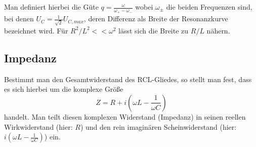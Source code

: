 Man definiert hierbei die Güte $q=\frac{\omega}{\omega_+ - \omega_-}$ wobei $\omega_\pm$ die beiden Frequenzen sind,
bei denen $U_C = \frac{1}{\sqrt{2}} U_{C,max}$, deren Differenz als Breite der Resonanzkurve bezeichnet wird.
Für $R^2/L^2 << \omega^2$ lässt sich die Breite zu $R/L$ nähern.

\subsection{Impedanz}
Bestimmt man den Gesamtwiderstand des RCL-Gliedes, so stellt man fest, dass es sich hierbei um die komplexe Größe
\begin{equation}
  Z = R + i\left(\omega L - \frac{1}{\omega C}\right)
\end{equation}
handelt. Man teilt diesen komplexen Widerstand (Impedanz) in seinen reellen Wirkwiderstand (hier: $R$) und den rein imaginären Scheinwiderstand (hier: $i \left(\omega L - \frac{1}{\omega C}\right)$) ein.
